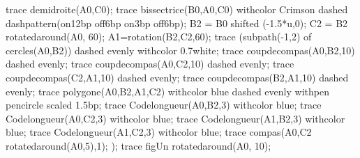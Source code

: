 \begin{changemargin}{0mm}{-25mm}
\begin{methode}
\begin{Geometrie}[CoinHD={(8.5u,5u)}]
                trace demidroite(A0,C0);
                trace bissectrice(B0,A0,C0) withcolor Crimson dashed dashpattern(on12bp off6bp on3bp off6bp);
                B2 = B0 shifted (-1.5*u,0);
                C2 = B2 rotatedaround(A0, 60);
                A1=rotation(B2,C2,60);
                trace (subpath(-1,2) of cercles(A0,B2)) dashed evenly withcolor 0.7white;
                trace coupdecompas(A0,B2,10) dashed evenly;
                trace coupdecompas(A0,C2,10) dashed evenly;
                trace coupdecompas(C2,A1,10) dashed evenly;
                trace coupdecompas(B2,A1,10) dashed evenly;
                trace polygone(A0,B2,A1,C2) withcolor blue dashed evenly withpen pencircle scaled 1.5bp;
                trace Codelongueur(A0,B2,3) withcolor blue;
                trace Codelongueur(A0,C2,3) withcolor blue;
                trace Codelongueur(A1,B2,3) withcolor blue;
                trace Codelongueur(A1,C2,3) withcolor blue;                
                trace compas(A0,C2 rotatedaround(A0,5),1);
            );
            trace figUn rotatedaround(A0, 10);
        \end{Geometrie}
    \end{methode}
\end{changemargin}
